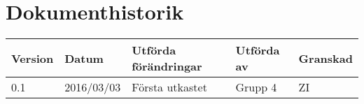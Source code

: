 \documentclass[11pt]{article}
\begin{document}
\tableofcontents

\pagebreak
\section*{Dokumenthistorik}
\begin{table}[h]
\begin{tabular}{|l|l|l|l|l|} \hline

\textbf{Version} & \textbf{Datum} & \textbf{Utförda förändringar} & \textbf{Utförda av} & \textbf{Granskad} \\ \hline
0.1 & 2016/03/03 &  Första utkastet & Grupp 4 & ZI \\ \hline
\end{tabular}
\end{table}

\pagebreak
{}
\end{document}
